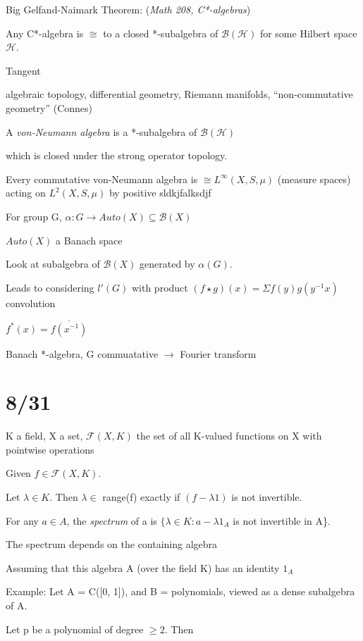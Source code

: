 \documentclass[12pt]{article}
\begin{document}
\noindent
Big Gelfand-Naimark Theorem: (\textit{Math 208, C*-algebras})

Any C*-algebra is $\cong$ to a closed *-subalgebra of $\mathscr{B}(\mathscr{H})$ for some Hilbert space $\mathscr{H}$.

\noindent
Tangent

algebraic topology, differential geometry, Riemann manifolds, ``non-commutative geometry'' (Connes)

\noindent
A \textit{von-Neumann algebra} is a *-subalgebra of $\mathscr{B}(\mathscr{H})$

which is closed under the strong operator topology.

Every commutative von-Neumann algebra is $\cong L^\infty(X, S, \mu)$ (measure spaces) acting on $L^2(X, S, \mu)$ by positive sldkjfalksdjf

\noindent
For group G, $\alpha: G \to Auto(X) \subseteq \mathscr{B}(X)$

$Auto(X)$ a Banach space

Look at subalgebra of $\mathscr{B}(X)$ generated by $\alpha(G)$.

Leads to considering $l'(G)$ with product $(f \star g)(x) = \Sigma f(y)g(y^{-1}x)$ convolution

$f^*(x) = \overline{f(x^{-1})}$

Banach *-algebra, G commuatative $\to$ Fourier transform

\section{8/31}

\noindent
K a field, X a set, $\mathscr{F}(X, K)$ the set of all K-valued functions on X with pointwise operations

Given $f \in \mathscr{F}(X, K)$.

Let $\lambda \in K$.  Then $\lambda \in$ range(f) exactly if $(f - \lambda 1)$ is not invertible.

\noindent
For any $a \in A$, the \textit{spectrum} of a is $\{\lambda \in K: a - \lambda 1_A$ is not invertible in A\}.

The spectrum depends on the containing algebra

Assuming that this algebra A  (over the field K) has an identity $1_A$

\noindent
Example: Let A = C([0, 1]), and B = polynomials, viewed as a dense subalgebra of A.

Let p be a polynomial of degree $\geq 2$.  Then
\end{document}
